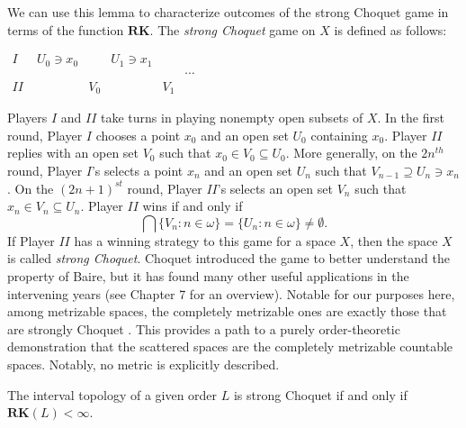 \documentclass[11pt]{amsart}
\theoremstyle{remark}
\def\RK{\textbf{RK}}
\begin{document}
We can use this lemma to characterize outcomes of the strong Choquet game in terms of the function $\RK$.
The \textit{strong Choquet} game on $X$ is defined as follows: 

\begin{center}
$
  \begin{array}{lccccr}
I\;&U_0\ni x_0&   &U_1\ni x_1&   &\\
 &   &   &   &   &\cdots\\
II\;&   &V_0&   &V_1& 
\end{array}   
 $
 \end{center}


Players $I$ and $II$ take turns in playing nonempty open subsets of $X$.
In the first round, Player $I$ chooses a point $x_0$ and an open set $U_0$ containing $x_0$.
Player $II$ replies with an open set $V_0$ such that $x_0\in V_0\subseteq U_0$.
More generally, on the $2n^{th}$ round, Player $I$'s selects a point $x_{n}$ and an open set $U_{n}$ such that $V_{n-1}\supseteq U_{n}\ni x_{n}$.
On the $(2n+1)^{st}$ round, Player $II$'s selects an open set $V_{n}$ such that $x_n\in V_{n}\subseteq U_n$. 
Player $II$ wins if and only if
\[\bigcap\{V_n: n\in \omega\}=\{U_n: n\in \omega\}\ne\emptyset.\]
If Player $II$ has a winning strategy to this game for a space $X$, then the space $X$ is called \textit{strong Choquet}.
Choquet introduced the game to better understand the property of Baire, but it has found many other useful applications in the intervening years (see \cite{T87} Chapter 7 for an overview).
Notable for our purposes here, among metrizable spaces, the completely metrizable ones are exactly those that are strongly Choquet \cite{C69}.
This provides a path to a purely order-theoretic demonstration that the scattered spaces are the completely metrizable countable spaces. 
Notably, no metric is explicitly described.

\begin{proposition}\label{prop:SChiffRk}
The interval topology of a given order $L$ is strong Choquet if and only if $\RK(L)<\infty$.
\end{proposition}
\end{document}
